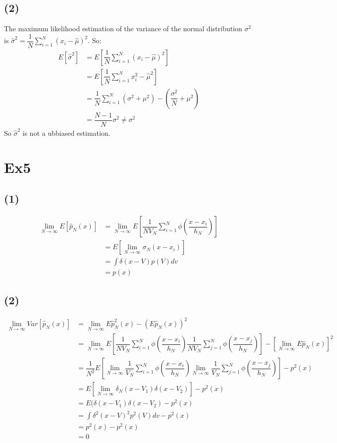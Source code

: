 \documentclass[10pt,a4paper]{article}
\begin{document}
\subsection{(2)}
The maximum likelihood estimation of the variance of  the normal distribution $\sigma^2$ is $\hat{\sigma}^2=\dfrac{1}{N}\sum_{i=1}^{N}(x_i-\hat{\mu})^2$.
So:
\begin{equation*}
    \begin{split}
        E[\hat{\sigma}^2]&=E[\dfrac{1}{N}\sum_{i=1}^{N}(x_i-\hat{\mu})^2]\\
                         &=E[\dfrac{1}{N}\sum_{i=1}^{N}x_i^2-\hat{\mu}^2]\\
                         &=\dfrac{1}{N}\sum_{i=1}^{N}(\sigma^2+\mu^2)-(\dfrac{\sigma^2}{N}+\mu^2)\\
                         &=\dfrac{N-1}{N}\sigma^2\neq\sigma^2
    \end{split}
\end{equation*}
So $\hat{\sigma}^2$ is not a ubbiased estimation.
\section{Ex5}
\subsection{(1)}
\begin{equation*}
\begin{split}
\lim\limits_{N\rightarrow\infty}E[\hat{p}_N(x)]&=\lim\limits_{N\rightarrow\infty}E[\dfrac{1}{NV_N}\sum_{i=1}^{N}\phi(\dfrac{x-x_i}{h_N})]\\
&=E[\lim\limits_{N\rightarrow\infty}\sigma_N(x-x_i)]\\
&=\int \delta(x-V)p(V)dv\\
&=p(x)
\end{split}
\end{equation*}
\subsection{(2)}
\begin{equation*}
\begin{split}
\lim\limits_{N\rightarrow \infty}Var[\hat{p}_N(x)]&=\lim\limits_{N\rightarrow \infty}{E\hat{p}^2_N(x)-(E\hat{p}_N(x))^2}\\
&=\lim\limits_{N\rightarrow\infty}E[\dfrac{1}{NV_N}\sum_{i=1}^{N}\phi(\dfrac{x-x_i}{h_N})\dfrac{1}{NV_N}\sum_{j=1}^{N}\phi(\dfrac{x-x_j}{h_N})]
-[\lim\limits_{N\rightarrow\infty}E\hat{p}_N(x)]^2\\
&=\dfrac{1}{N^2}E[\lim\limits_{N\rightarrow\infty}\dfrac{1}{V_N}\sum_{i=1}^{N}\phi(\dfrac{x-x_i}{h_N})\lim\limits_{N\rightarrow\infty}\dfrac{1}{V_N}\sum_{j=1}^{N}
\phi(\dfrac{x-x_j}{h_N})]-p^2(x)\\
&=E[\lim\limits_{N\rightarrow\infty}\delta_N(x-V_1)\delta(x-V_2)]-p^2(x)\\
&=E(\delta(x-V_1)\delta(x-V_2)-p^2(x)\\
&=\int\delta^2(x-V)^2p^2(V)dv-p^2(x)\\
&=p^2(x)-p^2(x)\\
&=0
\end{split}
\end{equation*}
\end{document}
